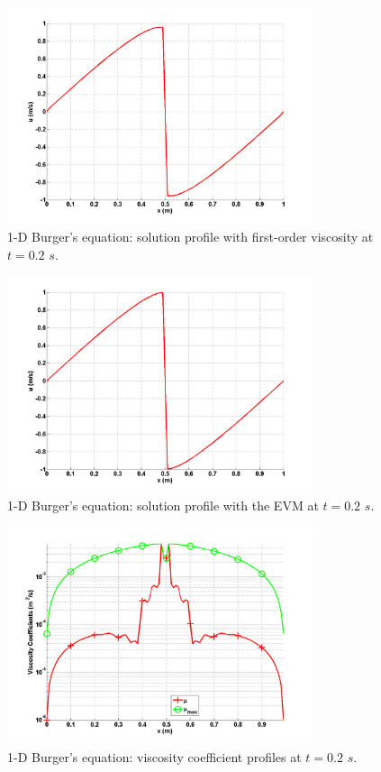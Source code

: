 \begin{figure}[H]
        \centering
        \includegraphics[width=0.8\textwidth]{figures/1D_sol_fo.png}
        \caption{1-D Burger's equation: solution profile with first-order viscosity at $t=0.2$ $s$.}
        \label{fig:1d_burger_fo}
\end{figure}
%        
\begin{figure}[H]
        \centering
        \includegraphics[width=0.8\textwidth]{figures/1D_sol_ev.png}
        \caption{1-D Burger's equation: solution profile with the EVM at $t=0.2$ $s$.}
        \label{fig:1d_burger_ev}
\end{figure}
%       
\begin{figure}[H]
    \centering
    \includegraphics[width=0.8\textwidth]{figures/1D_visc.png}
    \caption{1-D Burger's equation: viscosity coefficient profiles at $t=0.2$ $s$.}
    \label{fig:1d_burger_visc}
\end{figure}
